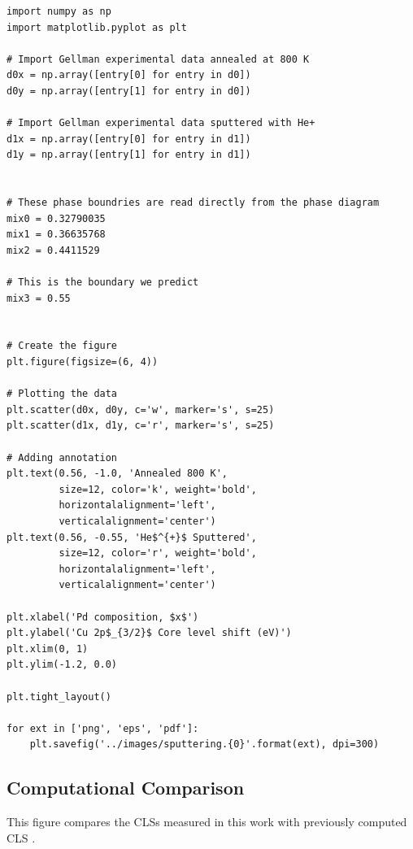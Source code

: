 \documentclass[number, sort&compress, review, 12pt]{elsarticle}
\begin{document}
\begin{verbatim}
import numpy as np
import matplotlib.pyplot as plt

# Import Gellman experimental data annealed at 800 K
d0x = np.array([entry[0] for entry in d0])
d0y = np.array([entry[1] for entry in d0])

# Import Gellman experimental data sputtered with He+
d1x = np.array([entry[0] for entry in d1])
d1y = np.array([entry[1] for entry in d1])


# These phase boundries are read directly from the phase diagram
mix0 = 0.32790035
mix1 = 0.36635768
mix2 = 0.4411529

# This is the boundary we predict
mix3 = 0.55


# Create the figure
plt.figure(figsize=(6, 4))

# Plotting the data
plt.scatter(d0x, d0y, c='w', marker='s', s=25)
plt.scatter(d1x, d1y, c='r', marker='s', s=25)

# Adding annotation
plt.text(0.56, -1.0, 'Annealed 800 K',
         size=12, color='k', weight='bold',
         horizontalalignment='left',
         verticalalignment='center')
plt.text(0.56, -0.55, 'He$^{+}$ Sputtered',
         size=12, color='r', weight='bold',
         horizontalalignment='left',
         verticalalignment='center')

plt.xlabel('Pd composition, $x$')
plt.ylabel('Cu 2p$_{3/2}$ Core level shift (eV)')
plt.xlim(0, 1)
plt.ylim(-1.2, 0.0)

plt.tight_layout()

for ext in ['png', 'eps', 'pdf']:
    plt.savefig('../images/sputtering.{0}'.format(ext), dpi=300)
\end{verbatim}

\subsection{Computational Comparison}
\label{sec-10-4}
This figure compares the CLSs measured in this work with previously computed CLS \cite{olovsson-2006-core-level}.
\end{document}
